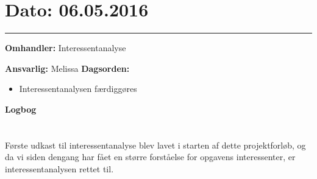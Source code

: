 

\section{Dato: 06.05.2016}
\hrule

\textbf{Omhandler:} Interessentanalyse

\textbf{Ansvarlig:} Melissa
\textbf{Dagsorden:}
\begin{itemize}
	\item Interessentanalysen færdiggøres
\end{itemize}

\textbf{Logbog}
\\
\\ \\
Første udkast til interessentanalyse blev lavet i starten af dette projektforløb, og da vi siden dengang har fået en større forståelse for opgavens interessenter, er interessentanalysen rettet til.